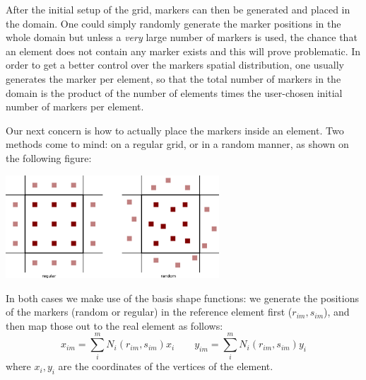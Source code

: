 



After the initial setup of the grid, markers can then be generated and placed in the domain. One could simply randomly generate 
the marker positions in the whole domain but unless a {\it very} large number of markers is used, the chance that an element does 
not contain any marker exists and this will prove problematic. In order to get a better control over the markers spatial distribution, 
one usually generates the marker per element, so that the total number of markers in the domain is the product of the number of 
elements times the user-chosen initial number of markers per element. 

Our next concern is how to actually place the markers inside an element. Two methods come to mind: on a regular grid, or in a random manner, 
as shown on the following figure:

\begin{center}
\includegraphics[width=8cm]{python_codes/fieldstone_markers_avrg/markers} 
\end{center}

In both cases we make use of the basis shape functions: we generate the positions of the markers (random or regular) in the reference
element first ($r_{im},s_{im}$), and then map those out to the real element as follows:
\[
x_{im}=\sum_i^m N_i(r_{im},s_{im}) x_i
\quad\quad
y_{im}=\sum_i^m N_i(r_{im},s_{im}) y_i
\]
where $x_i,y_i$ are the coordinates of the vertices of the element.

